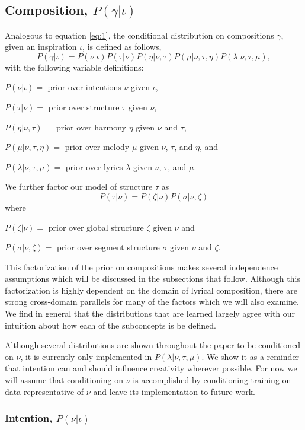 \documentclass[letterpaper]{article}
\begin{document}
\subsection{Composition, $P(\gamma|\iota)$}

Analogous to equation \ref{eq:1}, the conditional distribution on compositions $\gamma$, given an inspiration $\iota$, is defined as follows,
\[ P(\gamma|\iota) = P(\nu|\iota)P(\tau|\nu)P(\eta|\nu,\tau)P(\mu|\nu,\tau,\eta)P(\lambda|\nu,\tau,\mu), \] 
\noindent with the following variable definitions:

\(P(\nu|\iota)=\) prior over intentions $\nu$ given $\iota$,

\(P(\tau|\nu)=\) prior over structure $\tau$ given $\nu$,

\(P(\eta|\nu,\tau)=\) prior over harmony $\eta$ given $\nu$ and $\tau$,

\(P(\mu|\nu,\tau,\eta)=\) prior over melody $\mu$ given $\nu$, $\tau$, and $\eta$, and

\(P(\lambda|\nu,\tau,\mu)=\) prior over lyrics $\lambda$ given $\nu$, $\tau$, and $\mu$.

We further factor our model of structure $\tau$ as
\[ P(\tau|\nu) = P(\zeta|\nu)P(\sigma|\nu,\zeta) \]
\noindent where 

\(P(\zeta|\nu)=\) prior over global structure $\zeta$ given $\nu$ and

\(P(\sigma|\nu,\zeta)=\) prior over segment structure $\sigma$ given $\nu$ and $\zeta$.

This factorization of the prior on compositions makes several independence assumptions which will be discussed in the subsections that follow. Although this factorization is highly dependent on the domain of lyrical composition, there are strong cross-domain parallels for many of the factors which we will also examine. We find in general that the distributions that are learned largely agree with our intuition about how each of the subconcepts is be defined.

Although several distributions are shown throughout the paper to be conditioned on $\nu$, it is currently only implemented in $P(\lambda|\nu,\tau,\mu)$. We show it as a reminder that intention can and should influence creativity wherever possible. For now we will assume that conditioning on $\nu$ is accomplished by conditioning training on data representative of $\nu$ and leave its implementation to future work.

\subsubsection{Intention, $P(\nu|\iota)$}
\end{document}
